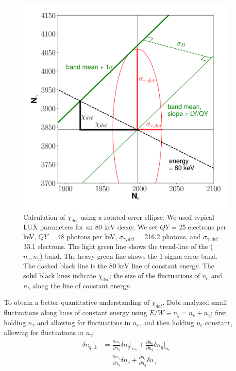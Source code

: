 \begin{figure}[h!]
  \centering
  \includegraphics[width=\textwidth]{Figures/toysigR_ellipse_graphic.pdf}
\caption{Calculation of $\chi_{det}$ using a rotated error ellipse. We used typical LUX parameters for an 80 keV decay. We set $QY$ = 25 electrons per keV, $QY$ = 48 photons per keV, $\sigma_{\gamma,det}$ = 216.2 photons, and $\sigma_{\gamma,det}$= 33.1 electrons. The light green line shows the trend-line of the ($n_e,n_{\gamma}$) band. The heavy green line shows the 1-sigma error band. The dashed black line is the 80 keV line of constant energy. The solid black lines indicate $\chi_{det}$; the size of the fluctuations of $n_e$ and $n_{\gamma}$ along the line of constant energy. }
\label{fig:errorellipse}
\end{figure}
To obtain a better quantitative understanding of $\chi_{det}$, Dobi analyzed small fluctuations along lines of constant energy using $E/W\equiv n_q=n_e+n_{\gamma}$; first holding $n_{\gamma}$ and allowing for fluctuations in $n_e$, and then holding $n_e$ constant, allowing for fluctuations in $n_{\gamma}$\cite{attila}:
\begin{equation}\label{eq:smallvar}
\begin{split}
\delta n_{q,\bot}&=\frac{\partial n_{\gamma}}{\partial n_{q}}\delta n_{q} \Big| _{n_{\gamma}}+\frac{\partial n_{e}}{\partial n_{q}}\delta n_{q} \Big| _{n_{e}}\\
&=\frac{\partial n_{\gamma}}{\partial n_{q}}\delta n_{e}+\frac{\partial n_{e}}{\partial n_{q}}\delta n_{\gamma}
\end{split}
\end{equation}
